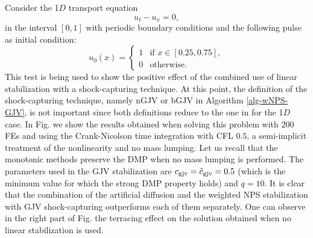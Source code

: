 Consider the 1$D$ transport equation 
\begin{equation}
\label{eq-eqtr}
u_t-u_x=0,
\end{equation}
in the interval $[0,1]$ with periodic boundary conditions and the following pulse as initial condition:
\begin{equation}\label{eq-trinc}
u_0(x) = \left\{
\begin{array}{ll}
1 & \textrm{if } x\in[0.25,0.75],\\
0 & \textrm{otherwise}.
\end{array}\right.
\end{equation}
This test is being used to show the positive effect of the combined use of linear stabilization with a shock-capturing technique. At this point, the definition of the shock-capturing technique, namely nGJV or bGJV in Algorithm \ref{alg-wNPS-GJV}, is not important since both definitions reduce to the one in \cite{burman_nonlinear_2007} for the 1$D$ case. In Fig.  we show the results obtained when solving this problem with $200$ FEs and using the Crank-Nicolson time integration  with CFL $0.5$, a semi-implicit treatment of the nonlinearity and no mass lumping. Let us recall that the monotonic methods preserve the DMP when no mass lumping is performed. The parameters used in the GJV stabilization are $c_{\rm gjv} = \tilde c_{\rm gjv} =0.5$ (which is the minimum value for which the strong DMP property holds) and $q=10$. It is clear that the combination of the artificial diffusion and the weighted NPS stabilization with GJV shock-capturing outperforms each of them separately. One can observe in the right part of Fig.  the terracing effect on the solution obtained when no linear stabilization is used.

